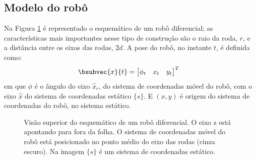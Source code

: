 \subsection{Modelo do robô}
Na Figura \ref{fig:diff-drive-schematic} é representado o esquemático de um robô diferencial; as características mais importantes nesse tipo de construção 
são o raio da roda, $r$, e a distância entre os eixos das rodas, $2d$. A 
pose do robô, no instante $t$, é definida como:
\begin{equation}
  \bsubvec{x}{t} = \begin{bmatrix}
    \phi_t & x_t & y_t
  \end{bmatrix}^T
  \label{eq:robot-pose}
\end{equation}
em que $\phi$ é o ângulo do eixo $\hat{x}_r$, do sistema de coordenadas móvel 
do robô, com o eixo $\hat{x}$ do sistema de coordenadas estático $\{s\}$. E $(x, y)$ é origem do sistema de coordenadas do robô, no sistema estático.
\begin{figure}[h]
  \centering
  
  \caption{Visão superior do esquemático de um robô diferencial. O eixo z está apontando para fora 
  da folha. O sistema de coordenadas móvel do robô está posicionado no ponto médio do eixo das rodas  (cinza escuro). Na imagem $\{s\}$ é um sistema de coordenadas estático.}
  \label{fig:diff-drive-schematic}
\end{figure}

